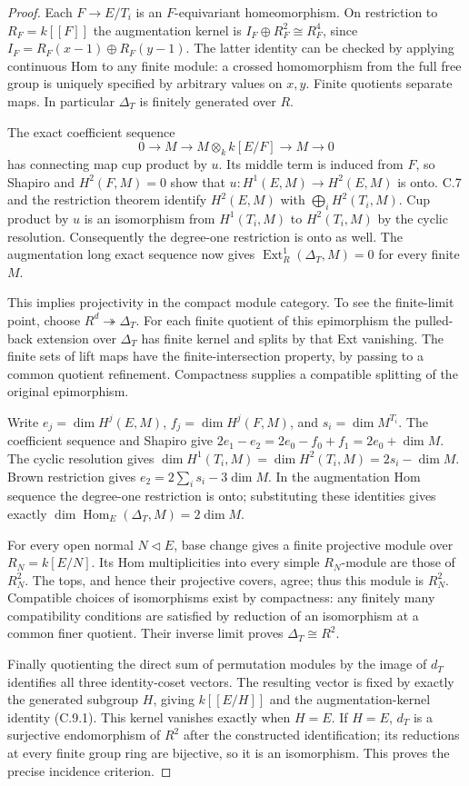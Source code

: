 \begin{proof}
Each $F\to E/T_i$ is an $F$-equivariant homeomorphism.
On restriction to $R_F=k[[F]]$ the augmentation kernel
is $I_F\oplus R_F^2\cong R_F^4$, since
$I_F=R_F(x-1)\oplus R_F(y-1)$.  The latter identity
can be checked by applying continuous Hom to any
finite module: a crossed homomorphism from the full
free group is uniquely specified by arbitrary values
on $x,y$.  Finite quotients separate maps.  In
particular $\Delta_T$ is finitely generated over $R$.

The exact coefficient sequence
\[
 0\to M\to M\otimes_k k[E/F]\to M\to0
\]
has connecting map cup product by $u$.  Its middle
term is induced from $F$, so Shapiro and
$H^2(F,M)=0$ show that $u:H^1(E,M)\to H^2(E,M)$
is onto.  C.7 and the restriction theorem identify
$H^2(E,M)$ with $\bigoplus_i H^2(T_i,M)$.  Cup
product by $u$ is an isomorphism from $H^1(T_i,M)$
to $H^2(T_i,M)$ by the cyclic resolution.  Consequently
the degree-one restriction is onto as well.  The
augmentation long exact sequence now gives
$\operatorname{Ext}^1_R(\Delta_T,M)=0$ for every
finite $M$.

This implies projectivity in the compact module
category.  To see the finite-limit point, choose
$R^d\twoheadrightarrow\Delta_T$.  For each finite
quotient of this epimorphism the pulled-back
extension over $\Delta_T$ has finite kernel and
splits by that Ext vanishing.  The finite sets of
lift maps have the finite-intersection property,
by passing to a common quotient refinement.
Compactness supplies a compatible splitting of
the original epimorphism.

Write $e_j=\dim H^j(E,M)$, $f_j=\dim H^j(F,M)$,
and $s_i=\dim M^{T_i}$.  The coefficient sequence
and Shapiro give
$2e_1-e_2=2e_0-f_0+f_1=2e_0+\dim M$.
The cyclic resolution gives
$\dim H^1(T_i,M)=\dim H^2(T_i,M)=2s_i-\dim M$.
Brown restriction gives $e_2=2\sum_i s_i-3\dim M$.
In the augmentation Hom sequence the degree-one
restriction is onto; substituting these identities
gives exactly
$\dim\operatorname{Hom}_E(\Delta_T,M)=2\dim M$.

For every open normal $N\lhd E$, base change gives
a finite projective module over $R_N=k[E/N]$.
Its Hom multiplicities into every simple $R_N$-module
are those of $R_N^2$.  The tops, and hence their
projective covers, agree; thus this module is
$R_N^2$.  Compatible choices of isomorphisms exist
by compactness: any finitely many compatibility
conditions are satisfied by reduction of an
isomorphism at a common finer quotient.  Their
inverse limit proves $\Delta_T\cong R^2$.

Finally quotienting the direct sum of permutation
modules by the image of $d_T$ identifies all three
identity-coset vectors.  The resulting vector is
fixed by exactly the generated subgroup $H$, giving
$k[[E/H]]$ and the augmentation-kernel identity
(C.9.1).  This kernel vanishes exactly when $H=E$.
If $H=E$, $d_T$ is a surjective endomorphism of
$R^2$ after the constructed identification; its
reductions at every finite group ring are
bijective, so it is an isomorphism.  This proves
the precise incidence criterion.
\end{proof}


